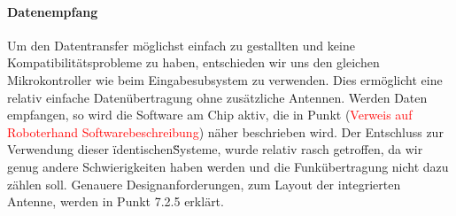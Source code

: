\documentclass[titlepage,12pt,twoside]{article}
\begin{document}
\paragraph{Datenempfang}
\hfill \break
\hfill \break
Um den Datentransfer möglichst einfach zu gestallten und keine Kompatibilitätsprobleme zu haben, entschieden wir uns den gleichen Mikrokontroller
wie beim Eingabesubsystem zu verwenden. Dies ermöglicht eine relativ einfache Datenübertragung ohne zusätzliche Antennen. Werden Daten empfangen,
so wird die Software am Chip aktiv, die in Punkt (\textcolor{red}{Verweis auf Roboterhand Softwarebeschreibung}) näher beschrieben wird. Der
Entschluss zur Verwendung dieser \"identischen\" Systeme, wurde relativ rasch getroffen, da wir genug andere Schwierigkeiten haben werden und 
die Funkübertragung nicht dazu zählen soll. Genauere Designanforderungen, zum Layout der integrierten Antenne, werden in Punkt 7.2.5 erklärt.
\end{document}
